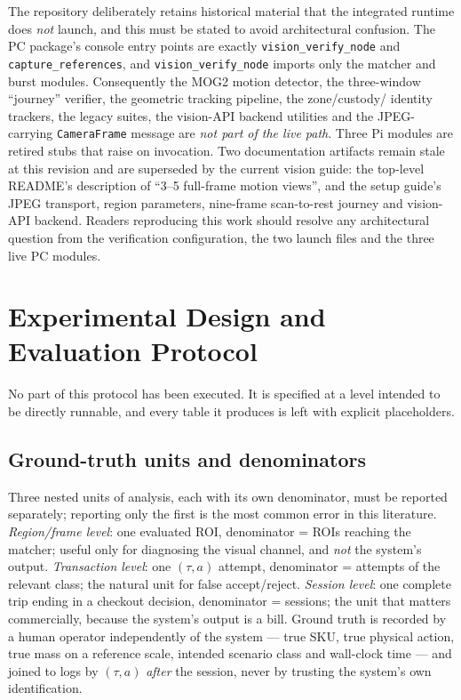 \documentclass[conference]{IEEEtran}
\begin{document}
The repository deliberately retains historical material that the integrated runtime does \emph{not}
launch, and this must be stated to avoid architectural confusion. The PC package's console entry
points are exactly \texttt{vision\_verify\_node} and \texttt{capture\_references}, and
\texttt{vision\_verify\_node} imports only the matcher and burst modules. Consequently the MOG2 motion
detector, the three-window ``journey'' verifier, the geometric tracking pipeline, the zone/custody/
identity trackers, the legacy suites, the vision-API backend utilities and the JPEG-carrying
\texttt{CameraFrame} message are \emph{not part of the live path}. Three Pi modules are retired stubs
that raise on invocation. Two documentation artifacts remain stale at this revision and are superseded
by the current vision guide: the top-level README's description of ``3--5 full-frame motion views'',
and the setup guide's JPEG transport, region parameters, nine-frame scan-to-rest journey and
vision-API backend. Readers reproducing this work should resolve any architectural question from the
verification configuration, the two launch files and the three live PC modules.

\section{Experimental Design and Evaluation Protocol}
\label{sec:eval}

No part of this protocol has been executed. It is specified at a level intended to be directly
runnable, and every table it produces is left with explicit placeholders.

\subsection{Ground-truth units and denominators}
Three nested units of analysis, each with its own denominator, must be reported separately; reporting
only the first is the most common error in this literature. \emph{Region/frame level}: one evaluated
ROI, denominator = ROIs reaching the matcher; useful only for diagnosing the visual channel, and
\emph{not} the system's output. \emph{Transaction level}: one $(\tau,a)$ attempt, denominator =
attempts of the relevant class; the natural unit for false accept/reject. \emph{Session level}: one
complete trip ending in a checkout decision, denominator = sessions; the unit that matters
commercially, because the system's output is a bill. Ground truth is recorded by a human operator
independently of the system --- true SKU, true physical action, true mass on a reference scale,
intended scenario class and wall-clock time --- and joined to logs by $(\tau,a)$ \emph{after} the
session, never by trusting the system's own identification.
\end{document}
